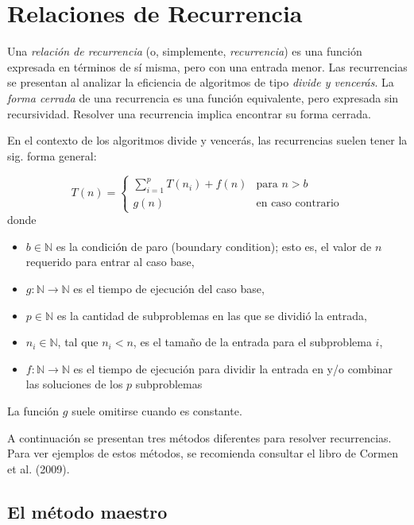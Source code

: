 
\chapter{Relaciones de Recurrencia}

Una \emph{relación de recurrencia} (o, simplemente, \emph{recurrencia})
es una función expresada en términos de sí misma, pero con una entrada
menor. Las recurrencias se presentan al analizar la eficiencia de
algoritmos de tipo \emph{divide y vencerás}. La \emph{forma cerrada}
de una recurrencia es una función equivalente, pero expresada sin
recursividad. Resolver una recurrencia implica encontrar su forma
cerrada.

En el contexto de los algoritmos divide y vencerás, las recurrencias
suelen tener la sig. forma general: 

\[
T(n)=\begin{cases}
\sum_{i=1}^{p}T(n_{i})+f(n) & \text{para }n>b\\
g(n) & \text{en caso contrario}
\end{cases}
\]
donde 
\begin{itemize}
\item $b\in\mathbb{N}$ es la condición de paro (boundary condition); esto
es, el valor de $n$ requerido para entrar al caso base, 
\item $g:\mathbb{N}\to\mathbb{N}$ es el tiempo de ejecución del caso base, 
\item $p\in\mathbb{N}$ es la cantidad de subproblemas en las que se dividió
la entrada, 
\item $n_{i}\in\mathbb{N}$, tal que $n_{i}<n$, es el tamaño de la entrada
para el subproblema $i$, 
\item $f:\mathbb{N}\to\mathbb{N}$ es el tiempo de ejecución para dividir
la entrada en y/o combinar las soluciones de los $p$ subproblemas 
\end{itemize}
La función $g$ suele omitirse cuando es constante. 

A continuación se presentan tres métodos diferentes para resolver
recurrencias. Para ver ejemplos de estos métodos, se recomienda consultar
el libro de Cormen et al. (2009).

\section{El método maestro}

